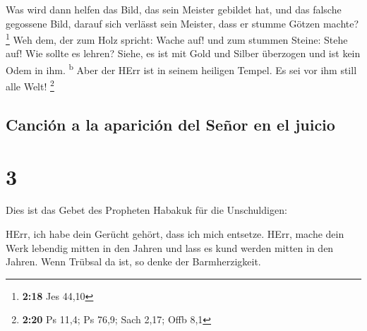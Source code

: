  Was wird dann helfen das Bild, das sein Meister gebildet
hat, und das falsche gegossene Bild, darauf sich verlässt sein Meister,
dass er stumme Götzen machte? \footnote{\textbf{2:18} Jes 44,10}
 Weh dem, der zum Holz spricht: Wache auf! und zum
stummen Steine: Stehe auf! Wie sollte es lehren? Siehe, es ist mit Gold
und Silber überzogen und ist kein Odem in ihm. \textsuperscript{b}
 Aber der HErr ist in seinem heiligen Tempel. Es sei vor
ihm still alle Welt! \footnote{\textbf{2:20} Ps 11,4; Ps 76,9; Sach
  2,17; Offb 8,1}

\hypertarget{canciuxf3n-a-la-apariciuxf3n-del-seuxf1or-en-el-juicio}{%
\subsection{Canción a la aparición del Señor en el
juicio}\label{canciuxf3n-a-la-apariciuxf3n-del-seuxf1or-en-el-juicio}}

\hypertarget{section-2}{%
\section{3}\label{section-2}}

 Dies ist das Gebet des Propheten Habakuk für die
Unschuldigen:

 HErr, ich habe dein Gerücht gehört, dass ich mich
entsetze. HErr, mache dein Werk lebendig mitten in den Jahren und lass
es kund werden mitten in den Jahren. Wenn Trübsal da ist, so denke der
Barmherzigkeit.

